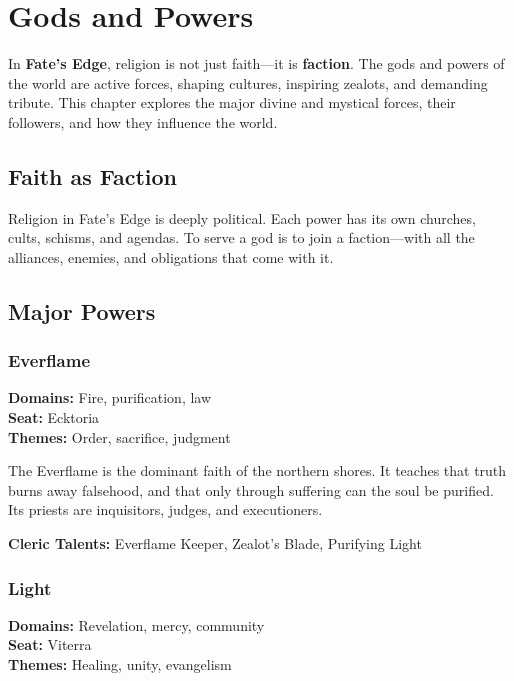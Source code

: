 
\chapter{Gods and Powers}

In \textbf{Fate’s Edge}, religion is not just faith—it is \textbf{faction}. The gods and powers of the world are active forces, shaping cultures, inspiring zealots, and demanding tribute. This chapter explores the major divine and mystical forces, their followers, and how they influence the world.

\section{Faith as Faction}

Religion in Fate’s Edge is deeply political. Each power has its own churches, cults, schisms, and agendas. To serve a god is to join a faction—with all the alliances, enemies, and obligations that come with it.

\section{Major Powers}

\subsection*{Everflame}

\textbf{Domains:} Fire, purification, law \\
\textbf{Seat:} Ecktoria \\
\textbf{Themes:} Order, sacrifice, judgment

The Everflame is the dominant faith of the northern shores. It teaches that truth burns away falsehood, and that only through suffering can the soul be purified. Its priests are inquisitors, judges, and executioners.

\textbf{Cleric Talents:} Everflame Keeper, Zealot's Blade, Purifying Light

\subsection*{Light}

\textbf{Domains:} Revelation, mercy, community \\
\textbf{Seat:} Viterra \\
\textbf{Themes:} Healing, unity, evangelism


